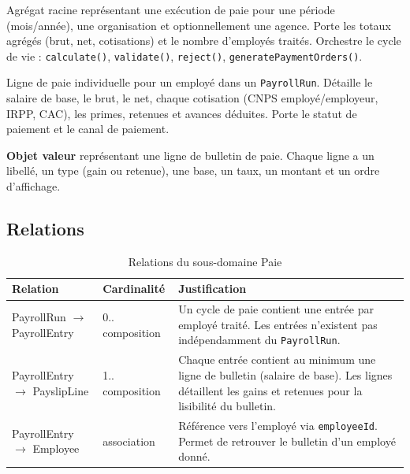 \documentclass[a4paper,12pt,openany]{book}
\begin{document}
    \begin{description}[style=nextline]
  \item[\texttt{PayrollRun}] Agrégat racine représentant une exécution de paie pour une période (mois/année), une organisation et optionnellement une agence. Porte les totaux agrégés (brut, net, cotisations) et le nombre d'employés traités. Orchestre le cycle de vie : \texttt{calculate()}, \texttt{validate()}, \texttt{reject()}, \texttt{generatePaymentOrders()}.

  \item[\texttt{PayrollEntry}] Ligne de paie individuelle pour un employé dans un \texttt{PayrollRun}. Détaille le salaire de base, le brut, le net, chaque cotisation (CNPS employé/employeur, IRPP, CAC), les primes, retenues et avances déduites. Porte le statut de paiement et le canal de paiement.

  \item[\texttt{PayslipLine}] \textbf{Objet valeur} représentant une ligne de bulletin de paie. Chaque ligne a un libellé, un type (gain ou retenue), une base, un taux, un montant et un ordre d'affichage.
    \end{description}

    \subsection{Relations}

    \begin{table}[H]
        \centering
        \caption{Relations du sous-domaine Paie}
        \label{tab:rel-payroll}
        \begin{tabularx}{\textwidth}{llX}
    \toprule
    \textbf{Relation} & \textbf{Cardinalité} & \textbf{Justification} \\
    \midrule
    PayrollRun $\longrightarrow$ PayrollEntry & 0..\textasteriskcentered{} composition & Un cycle de paie contient une entrée par employé traité. Les entrées n'existent pas indépendamment du \texttt{PayrollRun}. \\
    PayrollEntry $\longrightarrow$ PayslipLine & 1..\textasteriskcentered{} composition & Chaque entrée contient au minimum une ligne de bulletin (salaire de base). Les lignes détaillent les gains et retenues pour la lisibilité du bulletin. \\
    PayrollEntry $\longrightarrow$ Employee & association & Référence vers l'employé via \texttt{employeeId}. Permet de retrouver le bulletin d'un employé donné. \\
    \bottomrule
        \end{tabularx}
    \end{table}
\end{document}
